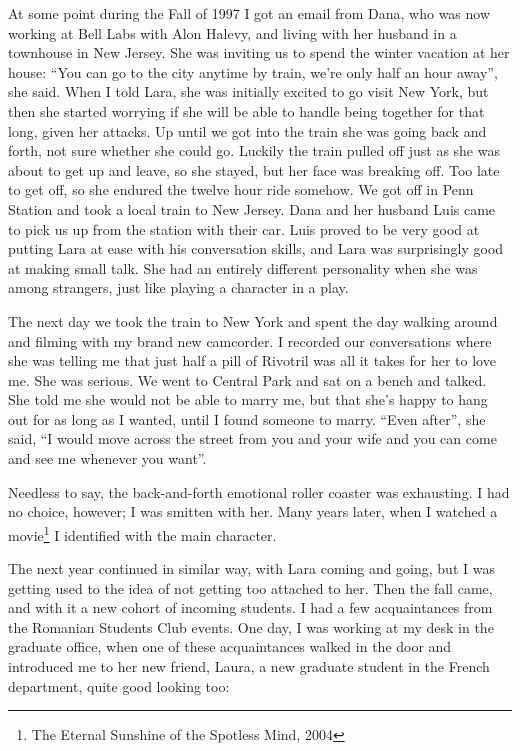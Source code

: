 \documentclass[12pt]{book}
\begin{document}
At some point during the Fall of 1997 I got an email from Dana, who was
now working at Bell Labs with Alon Halevy, and living with her husband
in a townhouse in New Jersey. She was inviting us to spend the winter
vacation at her house: ``You can go to the city anytime by train, we're
only half an hour away'', she said. When I told Lara, she was initially
excited to go visit New York, but then she started worrying if she will
be able to handle being together for that long, given her attacks. Up
until we got into the train she was going back and forth, not sure
whether she could go. Luckily the train pulled off just as she was about
to get up and leave, so she stayed, but her face was breaking off. Too
late to get off, so she endured the twelve hour ride somehow. We got off
in Penn Station and took a local train to New Jersey. Dana and her
husband Luis came to pick us up from the station with their car. Luis
proved to be very good at putting Lara at ease with his conversation
skills, and Lara was surprisingly good at making small talk. She had an
entirely different personality when she was among strangers, just like
playing a character in a play.

The next day we took the train to New York and spent the day walking
around and filming with my brand new camcorder. I recorded our
conversations where she was telling me that just half a pill of Rivotril
was all it takes for her to love me. She was serious. We went to Central
Park and sat on a bench and talked. She told me she would not be able to
marry me, but that she's happy to hang out for as long as I wanted,
until I found someone to marry. ``Even after'', she said, ``I would move
across the street from you and your wife and you can come and see me
whenever you want''.

Needless to say, the back-and-forth emotional roller coaster was
exhausting. I had no choice, however; I was smitten with her. Many years
later, when I watched a movie\footnote{
  The Eternal Sunshine of the Spotless Mind, 2004} I identified with
the main character.

The next year continued in similar way, with Lara coming and going, but
I was getting used to the idea of not getting too attached to her. Then
the fall came, and with it a new cohort of incoming students. I had a
few acquaintances from the Romanian Students Club events. One day, I was
working at my desk in the graduate office, when one of these
acquaintances walked in the door and introduced me to her new friend,
Laura, a new graduate student in the French department, quite good
looking too:
\end{document}
